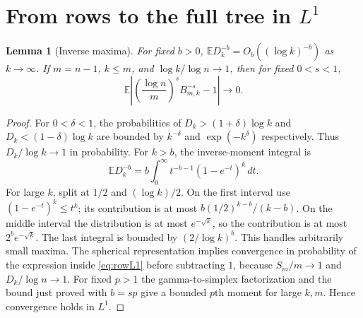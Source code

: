 \documentclass[11pt]{article}
\newtheorem{lemma}[theorem]{Lemma}
\newcommand{\E}{\mathbb E}
\begin{document}
\section{From rows to the full tree in \texorpdfstring{$L^1$}{L1}}
\begin{lemma}[Inverse maxima]\label{lem:max}
For fixed $b>0$, $\E D_k^{-b}=O_b((\log k)^{-b})$ as $k\to\infty$. If $m=n-1$, $k\le m$, and $\log k/\log n\to1$, then for fixed $0<s<1$,
\begin{equation}
\E\left|\left(\frac{\log n}{m}\right)^s B_{m,k}^{-s}-1\right|\to0.\label{eq:rowL1}
\end{equation}
\end{lemma}
\begin{proof}
For $0<\delta<1$, the probabilities of $D_k>(1+\delta)\log k$ and $D_k<(1-\delta)\log k$ are bounded by $k^{-\delta}$ and $\exp(-k^\delta)$ respectively. Thus $D_k/\log k\to1$ in probability. For $k>b$, the inverse-moment integral is
\[
\E D_k^{-b}=b\int_0^\infty t^{-b-1}(1-e^{-t})^k\,dt.
\]
For large $k$, split at $1/2$ and $(\log k)/2$. On the first interval use $(1-e^{-t})^k\le t^k$; its contribution is at most $b(1/2)^{k-b}/(k-b)$. On the middle interval the distribution is at most $e^{-\sqrt{k}}$, so the contribution is at most $2^b e^{-\sqrt{k}}$. The last integral is bounded by $(2/\log k)^b$. This handles arbitrarily small maxima. The spherical representation implies convergence in probability of the expression inside \eqref{eq:rowL1} before subtracting $1$, because $S_m/m\to1$ and $D_k/\log n\to1$. For fixed $p>1$ the gamma-to-simplex factorization and the bound just proved with $b=sp$ give a bounded $p$th moment for large $k,m$. Hence convergence holds in $L^1$.
\end{proof}
\end{document}
